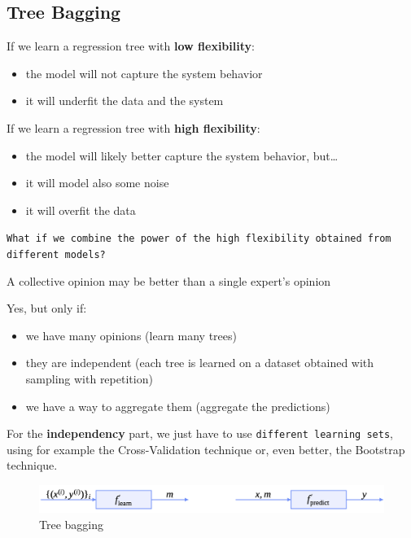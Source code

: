 \subsection{Tree Bagging}

If we learn a regression tree with \textbf{low flexibility}:
\begin{itemize}
    \item the model will not capture the system behavior 
    \item it will underfit the data and the system 
\end{itemize}
If we learn a regression tree with \textbf{high flexibility}:
\begin{itemize}
    \item the model will likely better capture the system behavior, but\dots
    \item it will model also some noise
    \item it will overfit the data 
\end{itemize}

\texttt{What if we combine the power of the high flexibility obtained from different models?}

\begin{definitionblock}
    A collective opinion may be better than a single expert's opinion
\end{definitionblock}

\begin{warningblock}
    Yes, but only if:
    \begin{itemize}
        \item we have many opinions \to (learn many trees)
        \item they are independent \to (each tree is learned on a dataset obtained with sampling with repetition)
        \item we have a way to aggregate them \to (aggregate the predictions)
    \end{itemize}
\end{warningblock}

For the \textbf{independency} part, we just have to use \texttt{different learning sets}, using for example the Cross-Validation technique or, even better, the Bootstrap technique.

\begin{figure}[H]
    \centering
    \includegraphics[width=1\textwidth]{assets/fig21.png}
    \caption{Tree bagging}
\end{figure}

